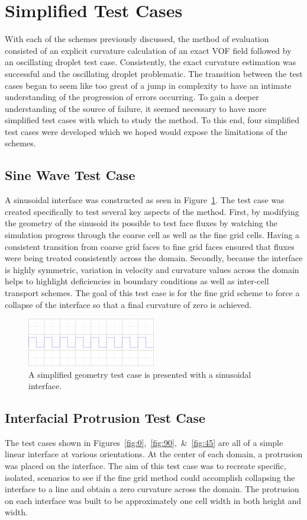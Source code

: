 \section{Simplified Test Cases}
With each of the schemes previously discussed, the method of evaluation consisted of an explicit curvature calculation of an exact VOF field followed by an oscillating droplet test case. Consistently, the exact curvature estimation was successful and the oscillating droplet problematic. The transition between the test cases began to seem like too great of a jump in complexity to have an intimate understanding of the progression of errors occurring. To gain a deeper understanding of the source of failure, it seemed necessary to have more simplified test cases with which to study the method. To this end, four simplified test cases were developed which we hoped would expose the limitations of the schemes.

\subsection{Sine Wave Test Case}
A sinusoidal interface was constructed as seen in Figure~\ref{fig:sine}. The test case was created specifically to test several key aspects of the method. First, by modifying the geometry of the sinusoid its possible to test face fluxes by watching the simulation progress through the coarse cell as well as the fine grid cells. Having a consistent transition from coarse grid faces to fine grid faces ensured that fluxes were being treated consistently across the domain. Secondly, because the interface is highly symmetric, variation in velocity and curvature values across the domain helps to highlight deficiencies in boundary conditions as well as inter-cell transport schemes. The goal of this test case is for the fine grid scheme to force a collapse of the interface so that a final curvature of zero is achieved.  
\begin{figure}[htbp]
	\centering
	\includegraphics[width=0.5\textwidth]{figs/sine}
	\caption{A simplified geometry test case is presented with a sinusoidal interface.}
	\label{fig:sine}
\end{figure}

\subsection{Interfacial Protrusion Test Case}
The test cases shown in Figures~\ref{fig:0},~\ref{fig:90},~\&~\ref{fig:45} are all of a simple linear interface at various orientations. At the center of each domain, a protrusion was placed on the interface. The aim of this test case was to recreate specific, isolated, scenarios to see if the fine grid method could accomplish collapsing the interface to a line and obtain a zero curvature across the domain. The protrusion on each interface was built to be approximately one cell width in both height and width.  

